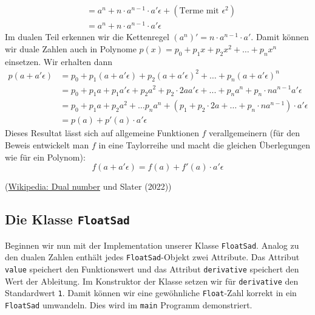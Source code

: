 \documentclass[
  letterpaper,
  DIV=11,
  oneside]{scrreprt}
\theoremstyle{definition}
\theoremstyle{definition}
\theoremstyle{remark}
\begin{document}
\begin{tcolorbox}
\[\begin{align}
    &= a^n + n \cdot a^{n-1} \cdot a'\epsilon + (\textrm{Terme mit }\epsilon^2) \\ 
    &= a^n + n \cdot a^{n-1} \cdot a' \epsilon
\end{align}
\] Im dualen Teil erkennen wir die Kettenregel
\((a^n)' = n\cdot a^{n-1}\cdot a'\). Damit können wir duale Zahlen auch
in Polynome \(p(x) = p_0 + p_1 x + p_2 x^2 + \ldots + p_n x^n\)
einsetzen. Wir erhalten dann \[
\begin{align}
    p(a+a'\epsilon) &= p_0 + p_1 (a+a'\epsilon) + p_2 (a+a'\epsilon)^2 + \ldots + p_n (a+a'\epsilon)^n \\ 
    &= p_0 + p_1 a + p_1 a'\epsilon + p_2 a^2 + p_2 \cdot 2a a' \epsilon + ... + p_n a^n + p_n \cdot n a^{n-1} a' \epsilon \\ 
    &= p_0 + p_1 a + p_2 a^2 + \ldots p_n a^n + (p_1 + p_2 \cdot 2a + \ldots + p_n \cdot n a^{n-1}) \cdot a' \epsilon \\
    &= p(a) + p'(a) \cdot a'\epsilon
\end{align}
\] Dieses Resultat lässt sich auf allgemeine Funktionen \(f\)
verallgemeinern (für den Beweis entwickelt man \(f\) in eine Taylorreihe
und macht die gleichen Überlegungen wie für ein Polynom): \[
f(a+a'\epsilon) = f(a) + f'(a)\cdot a'\epsilon
\]

(\href{https://en.wikipedia.org/wiki/Dual_number}{Wikipedia: Dual
number} und Slater (2022))
\end{tcolorbox}

\hypertarget{sec-FoatSadClassDescription}{%
\subsection{\texorpdfstring{Die Klasse
\texttt{FloatSad}}{Die Klasse FloatSad}}\label{sec-FoatSadClassDescription}}

Beginnen wir nun mit der Implementation unserer Klasse
\texttt{FloatSad}. Analog zu den dualen Zahlen enthält jedes
\texttt{FloatSad}-Objekt zwei Attribute. Das Attribut \texttt{value}
speichert den Funktionswert und das Attribut \texttt{derivative}
speichert den Wert der Ableitung. Im Konstruktor der Klasse setzen wir
für \texttt{derivative} den Standardwert \texttt{1}. Damit können wir
eine gewöhnliche \texttt{Float}-Zahl korrekt in ein \texttt{FloatSad}
umwandeln. Dies wird im \texttt{main} Programm demonstriert.
\end{document}
